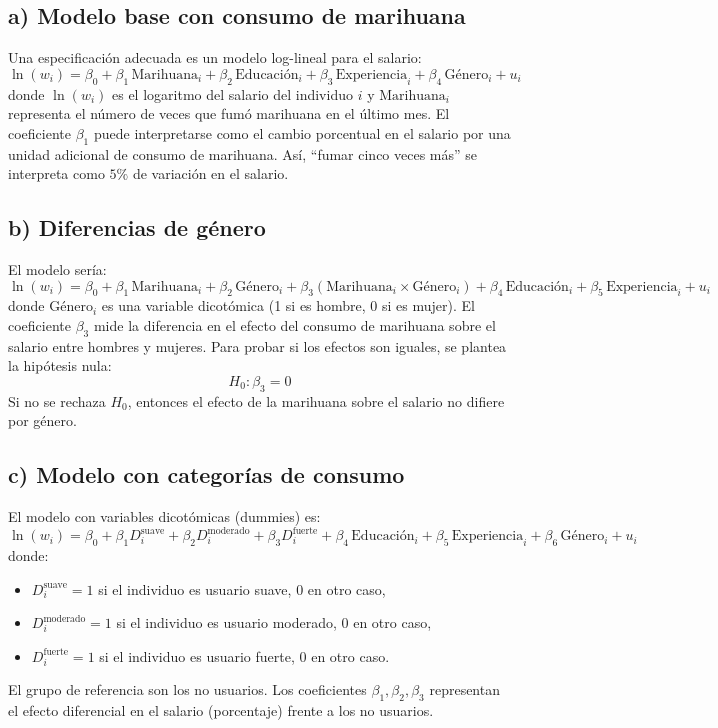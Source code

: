 \documentclass[12pt]{article}
\begin{document}
\subsection*{a) Modelo base con consumo de marihuana}
    Una especificación adecuada es un modelo log-lineal para el salario:
    \[
    \ln(w_i) = \beta_0 + \beta_1 \, \text{Marihuana}_i + \beta_2 \, \text{Educación}_i 
    + \beta_3 \, \text{Experiencia}_i + \beta_4 \, \text{Género}_i + u_i
    \]
    donde $\ln(w_i)$ es el logaritmo del salario del individuo $i$ y 
    $\text{Marihuana}_i$ representa el número de veces que fumó marihuana en el último mes. 
    El coeficiente $\beta_1$ puede interpretarse como el cambio porcentual en el salario por una unidad adicional de consumo de marihuana. 
    Así, ``fumar cinco veces más'' se interpreta como $5\%$ de variación en el salario.

\subsection*{b) Diferencias de género}
    El modelo sería:
    \[
    \ln(w_i) = \beta_0 + \beta_1 \, \text{Marihuana}_i + \beta_2 \, \text{Género}_i 
    + \beta_3 (\text{Marihuana}_i \times \text{Género}_i) 
    + \beta_4 \, \text{Educación}_i + \beta_5 \, \text{Experiencia}_i + u_i
    \]
    donde $\text{Género}_i$ es una variable dicotómica (1 si es hombre, 0 si es mujer). 
    El coeficiente $\beta_3$ mide la diferencia en el efecto del consumo de marihuana sobre el salario entre hombres y mujeres.  
    Para probar si los efectos son iguales, se plantea la hipótesis nula:
    \[
    H_0: \beta_3 = 0
    \]
    Si no se rechaza $H_0$, entonces el efecto de la marihuana sobre el salario no difiere por género.

\subsection*{c) Modelo con categorías de consumo}
    El modelo con variables dicotómicas (dummies) es:
    \[
    \ln(w_i) = \beta_0 + \beta_1 D^{\text{suave}}_i + \beta_2 D^{\text{moderado}}_i + \beta_3 D^{\text{fuerte}}_i 
    + \beta_4 \, \text{Educación}_i + \beta_5 \, \text{Experiencia}_i + \beta_6 \, \text{Género}_i + u_i
    \]
    donde:
    \begin{itemize}
        \item $D^{\text{suave}}_i = 1$ si el individuo es usuario suave, 0 en otro caso,
        \item $D^{\text{moderado}}_i = 1$ si el individuo es usuario moderado, 0 en otro caso,
        \item $D^{\text{fuerte}}_i = 1$ si el individuo es usuario fuerte, 0 en otro caso.
    \end{itemize}
    El grupo de referencia son los no usuarios.  
    Los coeficientes $\beta_1, \beta_2, \beta_3$ representan el efecto diferencial en el salario (porcentaje) frente a los no usuarios.
\end{document}
